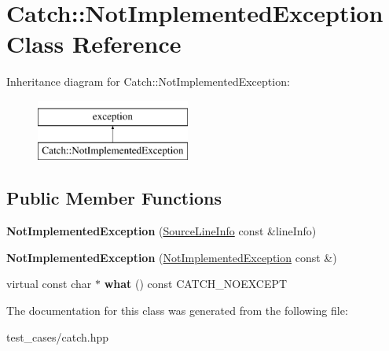 \hypertarget{classCatch_1_1NotImplementedException}{}\section{Catch\+:\+:Not\+Implemented\+Exception Class Reference}
\label{classCatch_1_1NotImplementedException}
Inheritance diagram for Catch\+:\+:Not\+Implemented\+Exception\+:\begin{figure}[H]
\begin{center}
\leavevmode
\includegraphics[height=2.000000cm]{classCatch_1_1NotImplementedException}
\end{center}
\end{figure}
\subsection*{Public Member Functions}
\begin{DoxyCompactItemize}
\item 
\mbox{\label{classCatch_1_1NotImplementedException_ab4f0a5c39d8ffb72c664e2c07e180634}} 
{\bfseries Not\+Implemented\+Exception} (\hyperlink{structCatch_1_1SourceLineInfo}{Source\+Line\+Info} const \&line\+Info)
\item 
\mbox{\label{classCatch_1_1NotImplementedException_a508a7a833455da2d3c10ea1a9d45e982}} 
{\bfseries Not\+Implemented\+Exception} (\hyperlink{classCatch_1_1NotImplementedException}{Not\+Implemented\+Exception} const \&)
\item 
\mbox{\label{classCatch_1_1NotImplementedException_ad4c13963f1a8feacda0cd331adda89e3}} 
virtual const char $\ast$ {\bfseries what} () const C\+A\+T\+C\+H\+\_\+\+N\+O\+E\+X\+C\+E\+PT
\end{DoxyCompactItemize}


The documentation for this class was generated from the following file\+:\begin{DoxyCompactItemize}
\item 
test\+\_\+cases/catch.\+hpp\end{DoxyCompactItemize}
